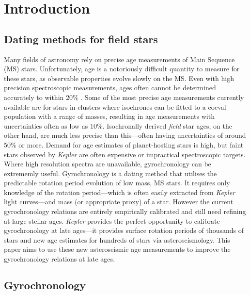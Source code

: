 \documentclass[10pt,preprint]{aastex}
\begin{document}
\section{Introduction}
\label{intro}
\subsection{Dating methods for field stars}

Many fields of astronomy rely on precise age measurements of Main Sequence (MS) stars.
Unfortunately, age is a notoriously difficult quantity to measure for these stars, as observable properties evolve slowly on the MS.
Even with high precision spectroscopic measurements, ages often cannot be determined accurately to within 20\% \citep{Soderblom2010}.
Some of the most precise age measurements currently available are for stars in clusters where isochrones can be fitted to a coeval population with a range of masses, resulting in age measurements with uncertainties often as low as 10\%.
Isochronally derived {\it field} star ages, on the other hand, are much less precise than this---often having uncertainties of around 50\% or more.
Demand for age estimates of planet-hosting stars is high, but faint stars observed by {\it Kepler} are often expensive or impractical spectroscopic targets.
Where high resolution spectra are unavailable, gyrochronology can be extrememly useful.
Gyrochronology is a dating method that utilises the predictable rotation period evolution of low mass, MS stars.
It requires only knowledge of the rotation period---which is often easily extracted from {\it Kepler} light curves---and mass (or appropriate proxy) of a star.
However the current gyrochronology relations are entirely empirically calibrated and still need refining at large stellar ages.
{\it Kepler} provides the perfect opportunity to calibrate gyrochronology at late ages---it provides surface rotation periods of thousands of stars and new age estimates for hundreds of stars via asteroseismology.
This paper aims to use these new asteroseismic age measurements to improve the gyrochronology relations at late ages.

\subsection{Gyrochronology}
\end{document}
